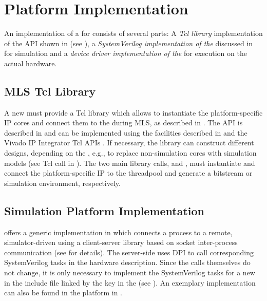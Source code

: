 \section{Platform Implementation}\label{sec:platform-implementation}%
An implementation of a  for \tpc{} consists of several parts:
A \emph{Tcl library} implementation of the API shown in  (see ), a \emph{SystemVerilog implementation of the } discussed in  for simulation and a \emph{device driver implementation of the } for execution on the actual hardware.
%
\subsection{MLS Tcl Library}\label{sec:mls-papi}%
A new  must provide a Tcl library which allows to instantiate the platform-specific IP cores and connect them to the  during MLS, as described in .
The API is described in  and can be implemented using the facilities described in  and the Vivado IP Integrator Tcl APIs \cite{ug835}.
If necessary, the library can construct different designs, depending on the , e.g., to replace non-simulation cores with simulation models (see  Tcl call in ).
The two main library calls,  and , must instantiate and connect the platform-specific IP to the threadpool and generate a bitstream or simulation environment, respectively.

\subsection{Simulation Platform Implementation}\label{sec:pi-sim}%
\tpc{} offers a generic  implementation in  which connects a process to a remote, simulator-driven  using a client-server library based on socket inter-process communication (see  for details).
The server-side uses DPI to call corresponding SystemVerilog tasks in the hardware description.
Since the  calls themselves do not change, it is only necessary to implement the SystemVerilog tasks for a new  in the include file linked by the  key in the  (see ).
An exemplary implementation can also be found in the  platform in .

